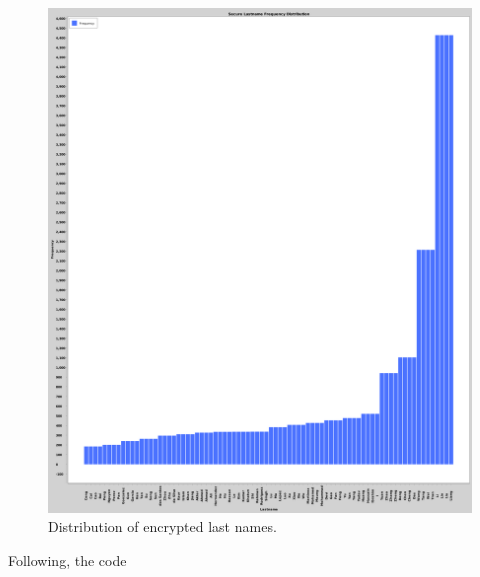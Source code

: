 \begin{figure}[h!]
    \centering
    \includegraphics[width=\textwidth]{03-ex2/Secure_Lastname_Frequency_Distribution_Plain.png}
    \caption{Distribution of encrypted last names.}
    \label{fig:Distribution-of-last-names-plain-sec}
\end{figure}

Following, the code 

